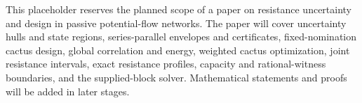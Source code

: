 This placeholder reserves the planned scope of a paper on resistance uncertainty and design in passive potential-flow networks. The paper will cover uncertainty hulls and state regions, series-parallel envelopes and certificates, fixed-nomination cactus design, global correlation and energy, weighted cactus optimization, joint resistance intervals, exact resistance profiles, capacity and rational-witness boundaries, and the supplied-block solver. Mathematical statements and proofs will be added in later stages.
